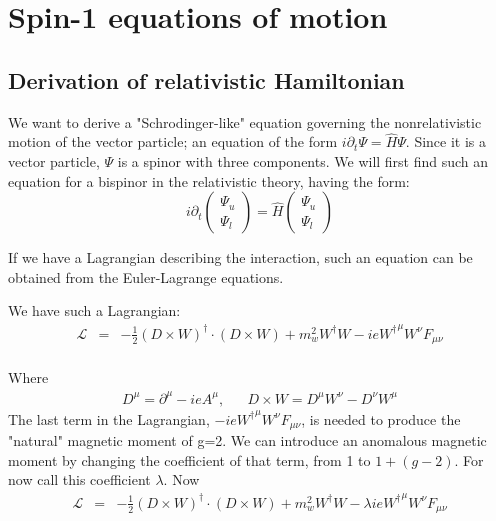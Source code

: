 
\section{Spin-1 equations of motion}
\subsection{Derivation of relativistic Hamiltonian}

We want to derive a "Schrodinger-like" equation governing the nonrelativistic motion of the vector particle; an equation of the form $i\partial_t \Psi = \hat{H} \Psi$.  Since it is a vector particle, $\Psi$ is a spinor with three components.  We will first find such an equation for a bispinor in the relativistic theory, having the form:
\[
i\partial_t 
\begin{pmatrix}
	\Psi_u	\\	\Psi_l
\end{pmatrix} 
=
\hat{H}
\begin{pmatrix}
	\Psi_u	\\	\Psi_l
\end{pmatrix}
\]

If we have a Lagrangian describing the interaction, such an equation can be obtained from the Euler-Lagrange equations.  


We have such a Lagrangian:
\begin{eqnarray*}
\mathcal{L} 
	&=&	-\frac{1}{2} (D \times W)^\dagger \cdot (D \times W) 
				+ m_w^2 W^\dagger W 
				- i e {W^\dagger}^\mu W^\nu F_{\mu \nu}	\\
\end{eqnarray*}

Where
\begin{eqnarray*}
		D^\mu	=	\partial^\mu - i e A^\mu ,
	&&
		D \times W = D^\mu W^\nu - D^\nu W^\mu
\end{eqnarray*}
The last term in the Lagrangian, $-ie{W^\dagger}^\mu W^\nu F_{\mu\nu}$, is needed to produce the "natural" magnetic moment of g=2.  We can introduce an anomalous magnetic moment by changing the coefficient of that term, from 1 to $1+(g-2)$.  For now call this coefficient $\lambda$.  Now
\begin{eqnarray*}
\mathcal{L} 
	&=&	-\frac{1}{2} (D \times W)^\dagger \cdot (D \times W) 
				+ m_w^2 W^\dagger W 
				- \lambda i e  {W^\dagger}^\mu W^\nu F_{\mu \nu}	\\
\end{eqnarray*}


